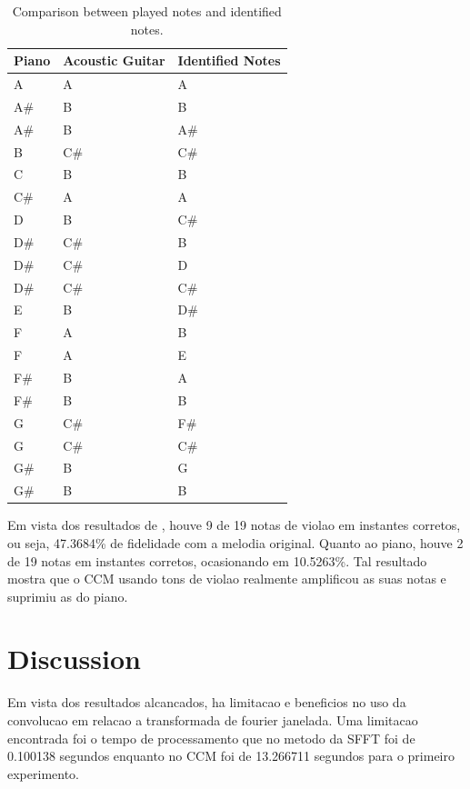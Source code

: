 \documentclass{article}
\begin{document}
	\begin{table}[h]
	 \begin{center}
	 \begin{tabular}{|l|l|l|}
	  \hline
	  Piano & Acoustic Guitar & Identified Notes \\
	  \hline
			  A & A &  A \\
		A\# &  B &  B \\
		    A\# &  B &    A\# \\
		    B  &   C\# &  C\# \\
		    C   &  B  &   B \\
		    C\# &  A   &  A \\
		    D   &  B   &  C\# \\
		    D\# &  C\# &  B \\
		    D\# &  C\# &  D \\
		    D\# &  C\# &  C\# \\
		    E   &  B  &   D\# \\
		    F   &  A   &  B \\
		    F   &  A  &   E \\
		    F\# &  B  &   A \\
		    F\# &  B   &  B \\
		    G   &  C\# &  F\# \\
		    G   &  C\# &  C\# \\
		    G\# &  B   &  G \\
		    G\# &  B  &   B \\
	  \hline
	 \end{tabular}
	\end{center}
	 \caption{Comparison between played notes and identified notes.}
	 \label{tab:table-2-ccm-violao}
	\end{table}

	\newpage
	Em vista dos resultados de , houve 9 de 19 notas de violao em instantes corretos, ou seja, 47.3684\% de fidelidade com a melodia original. Quanto ao piano, houve 2 de 19 notas em instantes corretos, ocasionando em 10.5263\%. Tal resultado mostra que o CCM usando tons de violao realmente amplificou as suas notas e suprimiu as do piano.


\section{Discussion}\label{sec:discussion}

	Em vista dos resultados alcancados, ha limitacao e beneficios no uso da convolucao em relacao a transformada de fourier janelada. Uma limitacao encontrada foi o tempo de processamento que no metodo da SFFT foi de 0.100138 segundos enquanto no CCM foi de 13.266711 segundos para o primeiro experimento.
\end{document}
